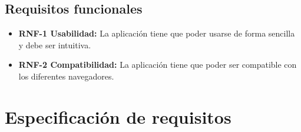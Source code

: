 \subsection{Requisitos funcionales}
\begin{itemize}
	\item \textbf{RNF-1 Usabilidad:} La aplicación tiene que poder usarse de forma sencilla y debe ser intuitiva.
	\item \textbf{RNF-2 Compatibilidad:} La aplicación tiene que poder ser compatible con los diferentes navegadores.
\end{itemize}

\section{Especificación de requisitos}


